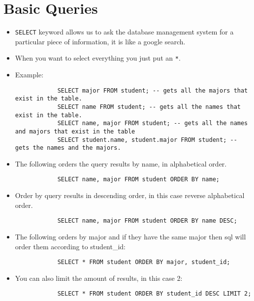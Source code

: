 \section{Basic Queries}
\begin{itemize}
    \item \texttt{SELECT} keyword allows us to ask the database management system for a particular piece of information, it is like a google search.
    \item When you want to select everything you just put an \texttt{*}.
    \item Example:
        \begin{verbatim}
            SELECT major FROM student; -- gets all the majors that exist in the table.
            SELECT name FROM student; -- gets all the names that exist in the table.
            SELECT name, major FROM student; -- gets all the names and majors that exist in the table
            SELECT student.name, student.major FROM student; -- gets the names and the majors.
        \end{verbatim}
    
    \item The following orders the query results by name, in alphabetical order.
        \begin{verbatim}
            SELECT name, major FROM student ORDER BY name; 
        \end{verbatim}
    
    \item Order by query results in descending order, in this case reverse alphabetical order.
        \begin{verbatim}
            SELECT name, major FROM student ORDER BY name DESC; 
        \end{verbatim}
    
    \item The following orders by major and if they have the same major then sql will order them according to student\_id:
        \begin{verbatim}
            SELECT * FROM student ORDER BY major, student_id;
        \end{verbatim}
    
    \item You can also limit the amount of results, in this case 2:
        \begin{verbatim}
            SELECT * FROM student ORDER BY student_id DESC LIMIT 2;
        \end{verbatim}
    

\end{itemize}
